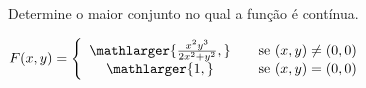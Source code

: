 
Determine o maior conjunto no qual a função é contínua.


\item $ F(x,y)=\left\{ 
				\begin{array}{cc}
					\mathlarger{\frac{x^2y^3}{2x^2+y^2},} & \quad \textnormal{se } (x,y)\neq(0,0)\\
					\mathlarger{1,} & \quad \textnormal{se } (x,y) = (0,0)\\
				\end{array}
				\right.$
